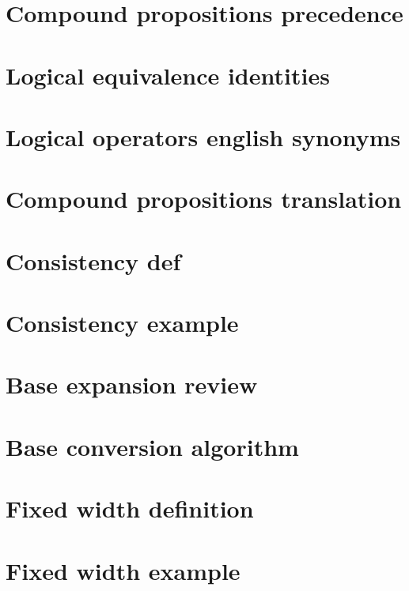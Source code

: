\section*{Compound propositions precedence}

\vfill
\section*{Logical equivalence identities}

\vfill
\section*{Logical operators english synonyms}

\vfill
\section*{Compound propositions translation}

\vfill
\section*{Consistency def}

\vfill
\section*{Consistency example}

\vfill
\section*{Base expansion review}

\vfill
\section*{Base conversion algorithm}

\vfill
\section*{Fixed width definition}

\vfill
\section*{Fixed width example}

\vfill
